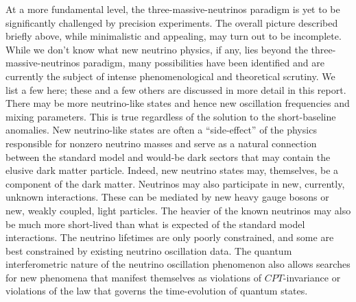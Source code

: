At a more fundamental level, the three-massive-neutrinos paradigm is yet to be significantly challenged by precision experiments. The overall picture described briefly above, while minimalistic and appealing, may turn out to be incomplete. While we don't know what new neutrino physics, if any, lies beyond the three-massive-neutrinos paradigm, many possibilities have been identified and are currently the subject of intense phenomenological and theoretical scrutiny. We list a few here; these and a few others are discussed in more detail in this report. There may be more neutrino-like states and hence new oscillation frequencies and mixing parameters. This is true regardless of the solution to the short-baseline anomalies. New neutrino-like states are often a ``side-effect'' of the physics responsible for nonzero neutrino masses and serve as a natural connection between the standard model and would-be dark sectors that may contain the elusive dark matter particle. Indeed, new neutrino states may, themselves, be a component of the dark matter. Neutrinos may also participate in new, currently, unknown interactions. These can be mediated by new heavy gauge bosons or new, weakly coupled, light particles. The heavier of the known neutrinos may also be much more short-lived than what is expected of the standard model interactions. The neutrino lifetimes are only poorly constrained, and some are best constrained by existing neutrino oscillation data. The quantum interferometric nature of the neutrino oscillation phenomenon also allows searches for new phenomena that manifest themselves as violations of $CPT$-invariance or violations of the law that governs the time-evolution of quantum states. 

